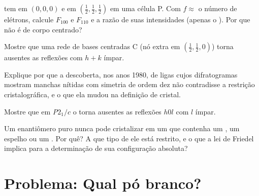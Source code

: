 \begin{exercise}[$\star\star$]\label{exo:b3:x-ray-diffraction:8}
 tem  em $(0,0,0)$ e  em $(\frac12,\frac12,\frac12)$ em uma célula P. Com $f
\approx$ o número de elétrons, calcule $F_{100}$ e $F_{110}$ e a razão de suas
intensidades (apenas o ). Por que  não é de corpo centrado?
\end{exercise}

\begin{exercise}[$\star\star$]\label{exo:b3:x-ray-diffraction:9}
Mostre que uma rede de bases centradas C (nó extra em $(\frac12,\frac12,0)$) torna ausentes
as reflexões com $h + k$ ímpar.
\end{exercise}

\begin{exercise}[$\star\star\star$]\label{exo:b3:x-ray-diffraction:10}
Explique por que a descoberta, nos anos 1980, de ligas cujos difratogramas
mostram manchas nítidas com simetria de ordem dez não contradisse a restrição
cristalográfica, e o que ela mudou na definição de cristal.
\end{exercise}

\begin{exercise}[$\star\star\star$]\label{exo:b3:x-ray-diffraction:11}
Mostre que em \textit{P}$2_1/c$ o  torna ausentes as reflexões $h0l$ com $l$
ímpar.
\end{exercise}

\begin{exercise}[$\star\star\star$]\label{exo:b3:x-ray-diffraction:12}
Um enantiômero puro nunca pode cristalizar em um  que contenha um
, um espelho ou um . Por quê? A que tipo de
 ele está restrito, e o que a lei de Friedel implica para a
determinação de sua configuração absoluta?
\end{exercise}

\clearpage
\enlargethispage{3\baselineskip}
\section{Problema: Qual pó branco?}

